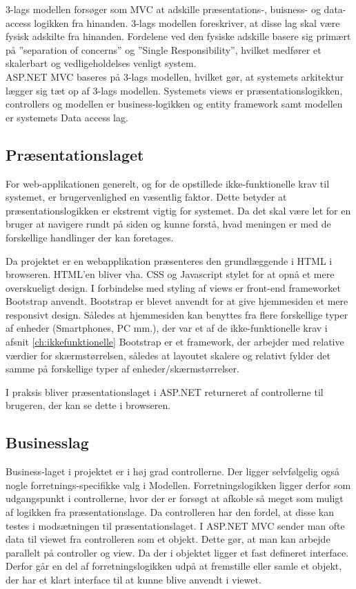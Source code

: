 3-lags modellen forsøger som MVC at adskille præsentations-, buisness- og data-access logikken fra hinanden. 3-lags modellen foreskriver, at disse lag skal være fysisk adskilte fra hinanden. Fordelene ved den fysiske adskille basere sig primært på ''separation of concerns'' og ''Single Responsibility'', hvilket medfører et skalerbart og vedligeholdelses venligt system.\\
ASP.NET MVC baseres på 3-lags modellen, hvilket gør, at systemets arkitektur lægger sig tæt op af 3-lags modellen.
Systemets views er præsentationslogikken, controllers og modellen er business-logikken og entity framework samt modellen er systemets Data access lag. 

\subsection{Præsentationslaget}
For web-applikationen generelt, og for de opstillede ikke-funktionelle krav til systemet, er brugervenlighed en væsentlig faktor. Dette betyder at præsentationslogikken er ekstremt vigtig for systemet. Da det skal være let for en bruger at navigere rundt på siden og kunne forstå, hvad meningen er med de forskellige handlinger der kan foretages.

Da projektet er en webapplikation præsenteres den grundlæggende i HTML i browseren. HTML'en bliver vha. CSS og Javascript stylet for at opnå et mere overskueligt design. I forbindelse med styling af views er front-end frameworket Bootstrap\cite{Bootstrap} anvendt. Bootstrap er blevet anvendt for at give hjemmesiden et mere responsivt design. Således at hjemmesiden kan benyttes fra flere forskellige typer af enheder (Smartphones, PC mm.), der var et af de ikke-funktionelle krav i afsnit \ref{ch:ikkefunktionelle}
Bootstrap er et framework, der arbejder med relative værdier for skærmstørrelsen, således at layoutet skalere og relativt fylder det samme på forskellige typer af enheder/skærmstørrelser.

I  praksis bliver  præsentationslaget i ASP.NET returneret af controllerne til brugeren, der kan se dette i browseren.%

\subsection{Businesslag}
Business-laget i projektet er i høj grad controllerne. Der ligger selvfølgelig også nogle forretnings-specifikke valg i Modellen. Forretningslogikken ligger derfor som udgangspunkt i controllerne, hvor der er forsøgt at afkoble så meget som muligt af logikken fra præsentationslage. Da controlleren har den fordel, at disse kan testes i modsætningen til præsentationslaget. I ASP.NET MVC sender man ofte data til viewet fra controlleren som et objekt. Dette gør, at man kan arbejde parallelt på controller og view. Da der i objektet ligger et fast defineret interface. Derfor går en del af forretningslogikken udpå at fremstille eller samle et objekt, der har et klart interface til at kunne blive anvendt i viewet. 


